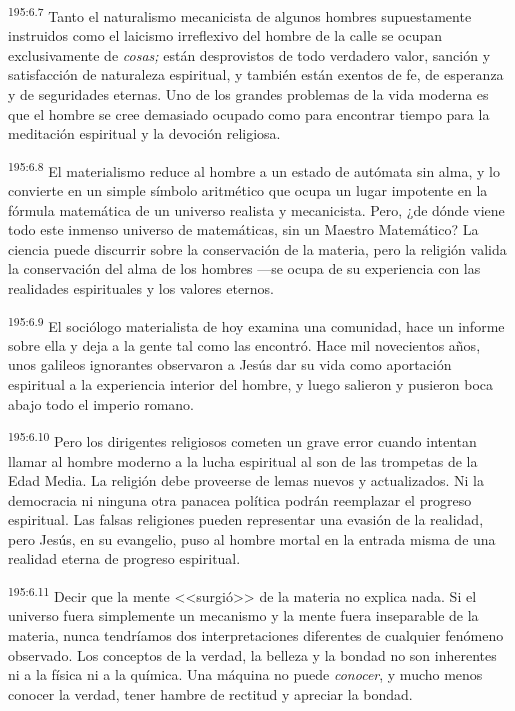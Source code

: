 \par 
\textsuperscript{195:6.7} Tanto el naturalismo mecanicista de algunos hombres supuestamente instruidos como el laicismo irreflexivo del hombre de la calle se ocupan exclusivamente de \textit{cosas;} están desprovistos de todo verdadero valor, sanción y satisfacción de naturaleza espiritual, y también están exentos de fe, de esperanza y de seguridades eternas. Uno de los grandes problemas de la vida moderna es que el hombre se cree demasiado ocupado como para encontrar tiempo para la meditación espiritual y la devoción religiosa.

\par 
\textsuperscript{195:6.8} El materialismo reduce al hombre a un estado de autómata sin alma, y lo convierte en un simple símbolo aritmético que ocupa un lugar impotente en la fórmula matemática de un universo realista y mecanicista. Pero, ¿de dónde viene todo este inmenso universo de matemáticas, sin un Maestro Matemático? La ciencia puede discurrir sobre la conservación de la materia, pero la religión valida la conservación del alma de los hombres ---se ocupa de su experiencia con las realidades espirituales y los valores eternos.

\par 
\textsuperscript{195:6.9} El sociólogo materialista de hoy examina una comunidad, hace un informe sobre ella y deja a la gente tal como las encontró. Hace mil novecientos años, unos galileos ignorantes observaron a Jesús dar su vida como aportación espiritual a la experiencia interior del hombre, y luego salieron y pusieron boca abajo todo el imperio romano.

\par 
\textsuperscript{195:6.10} Pero los dirigentes religiosos cometen un grave error cuando intentan llamar al hombre moderno a la lucha espiritual al son de las trompetas de la Edad Media. La religión debe proveerse de lemas nuevos y actualizados. Ni la democracia ni ninguna otra panacea política podrán reemplazar el progreso espiritual. Las falsas religiones pueden representar una evasión de la realidad, pero Jesús, en su evangelio, puso al hombre mortal en la entrada misma de una realidad eterna de progreso espiritual.

\par 
\textsuperscript{195:6.11} Decir que la mente <<surgió>> de la materia no explica nada. Si el universo fuera simplemente un mecanismo y la mente fuera inseparable de la materia, nunca tendríamos dos interpretaciones diferentes de cualquier fenómeno observado. Los conceptos de la verdad, la belleza y la bondad no son inherentes ni a la física ni a la química. Una máquina no puede \textit{conocer}, y mucho menos conocer la verdad, tener hambre de rectitud y apreciar la bondad.

